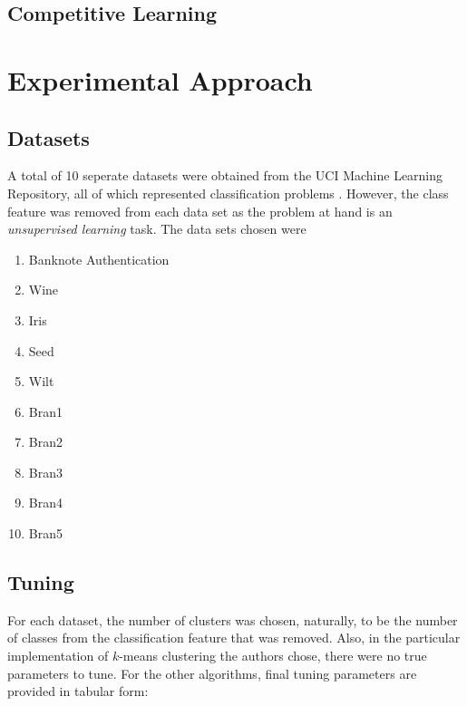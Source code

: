 \documentclass[conference]{IEEEtran}
\begin{document}
  \subsection{Competitive Learning}

\section{Experimental Approach}

\subsection{Datasets}
  A total of 10 seperate datasets were obtained from the UCI Machine Learning Repository, all of which represented classification problems \cite{lichman}. However, the class feature was removed from each data set as the problem at hand is an \textit{unsupervised learning} task. The data sets chosen were
  \begin{enumerate}
  \item Banknote Authentication
  \item Wine
  \item Iris
  \item Seed
  \item Wilt
  \item Bran1
  \item Bran2
  \item Bran3
  \item Bran4
  \item Bran5
  \end{enumerate}

  \subsection{Tuning}
  For each dataset, the number of clusters was chosen, naturally, to be the number of classes from the classification feature that was removed. Also, in the particular implementation of $k$-means clustering the authors chose, there were no true parameters to tune. For the other algorithms, final tuning parameters are provided in tabular form:
  
\end{document}
